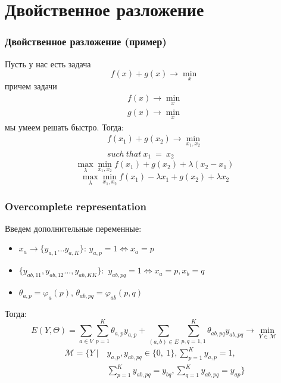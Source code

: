 \documentclass[smaller,unicode,hyperref={unicode=true}]{beamer}
\begin{document}
\section{Двойственное разложение}
\begin{frame}
  \frametitle{Двойственное разложение (пример)}
  Пусть у нас есть задача
  \begin{equation*}
    f(x) + g(x) \rightarrow \min_{x}
  \end{equation*}
  причем задачи
  \begin{align*}
      f(x) \rightarrow \min_{x}\\
      g(x) \rightarrow \min_{x}
  \end{align*}
  мы умеем решать быстро. Тогда:
  \begin{align*}
      f(x_1) + g(x_2) \rightarrow \min_{x_1, x_2}\\
      such~that~x_1~=~x_2
  \end{align*}
  \begin{equation*}
      \max_{\lambda} \min_{x_1, x_2} f(x_1) + g(x_2) + \lambda (x_2 - x_1)
  \end{equation*}
  \begin{equation*}
      \max_{\lambda} \min_{x_1, x_2} f(x_1) - \lambda x_1 + g(x_2) + \lambda x_2
  \end{equation*}
\end{frame}

\begin{frame}
  \frametitle{Overcomplete representation}
  Введем дополнительные переменные:
  \begin{itemize}
    \item $x_a \rightarrow \{y_{a,1} \dots y_{a,K} \}$: $y_{a,p} = 1 \Leftrightarrow x_a = p$
    \item $\{y_{ab,11}, y_{ab,12}\dots, y_{ab,KK}\}$:~$y_{ab,pq} = 1 \Leftrightarrow x_a = p, x_b = q$
    \item $\theta_{a,p} = \varphi_{a} (p)$, $\theta_{ab,pq} = \varphi_{ab} (p, q)$
  \end{itemize}
  Тогда:
  \begin{equation}
      E(Y, \Theta) = \sum_{a \in V} \sum_{p = 1}^{K} \theta_{a,p} y_{a,p} + \sum_{(a,b) \in E} \sum_{p,q = 1,1}^{K} \theta_{ab,pq} y_{ab,pq} \rightarrow \min_{Y \in \mathcal{M}}
    \label{eq:main_problem}
  \end{equation}
  \begin{align*}
      \mathcal{M} = \Bigg \{ Y~|~&y_{a,p}, y_{ab,pq} \in \{0,~1\}, \sum_{p = 1}^{K} y_{a,p} = 1,\\
    &\sum_{p = 1}^{K} y_{ab,pq} = y_{bq}, \sum_{q = 1}^{K} y_{ab,pq} = y_{ap} \Bigg \}
  \end{align*}
\end{frame}
\end{document}
